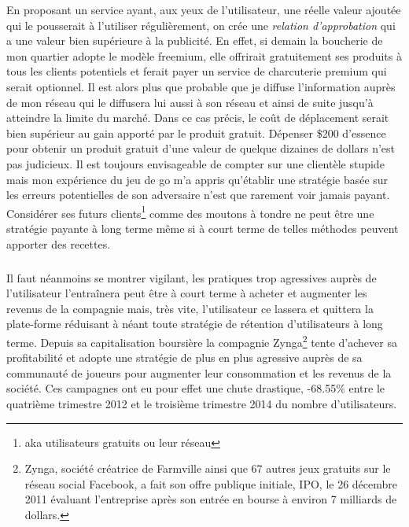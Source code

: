 \documentclass[11pt, a4paper ]{article}
\begin{document}
\begin{spacing}{1.5}
En proposant un service ayant, aux yeux de l'utilisateur, une réelle valeur ajoutée qui le pousserait à l'utiliser régulièrement, on crée une \emph{relation d'approbation} qui a une valeur bien supérieure à la publicité.
En effet, si demain la boucherie de mon quartier adopte le modèle freemium, elle offrirait gratuitement ses produits à tous les clients potentiels et ferait payer un service de charcuterie premium qui serait optionnel.
Il est alors plus que probable que je diffuse l'information auprès de mon réseau qui le diffusera lui aussi à son réseau et ainsi de suite jusqu'à atteindre la limite du marché. Dans ce cas précis, le coût de déplacement serait bien supérieur au gain apporté par le produit gratuit.
Dépenser \$200 d'essence pour obtenir un produit gratuit d'une valeur de quelque dizaines de dollars n'est pas judicieux. Il est toujours envisageable de compter sur une clientèle stupide mais mon expérience du jeu de go m'a appris qu'établir une stratégie basée sur les erreurs potentielles de son adversaire n'est que rarement voir jamais payant.
Considérer ses futurs clients\footnote{aka utilisateurs gratuits ou leur réseau} comme des moutons à tondre ne peut être une stratégie payante à long terme même si à court terme de telles méthodes peuvent apporter des recettes.
\subparagraph{}
Il faut néanmoins se montrer vigilant, les pratiques trop agressives auprès de l'utilisateur l’entraînera peut être à court terme à acheter et augmenter les revenus de la compagnie mais, très vite, l'utilisateur ce lassera et quittera la plate-forme réduisant à néant toute stratégie de rétention d'utilisateurs à long terme. Depuis sa capitalisation boursière la compagnie Zynga\footnote{Zynga, société créatrice de Farmville ainsi que 67 autres jeux gratuits sur le réseau social Facebook, a fait son offre publique initiale, IPO, le 26 décembre 2011 évaluant l'entreprise après son entrée en bourse à environ 7 milliards de dollars.\cite{ipoZynga}} tente d'achever sa profitabilité et adopte une stratégie de plus en plus agressive auprès de sa communauté de joueurs pour augmenter leur consommation et les revenus de la société. Ces campagnes ont eu pour effet une chute drastique, -68.55\% entre le quatrième trimestre 2012 et le troisième trimestre 2014 du nombre d'utilisateurs.


\end{spacing}
\end{document}
